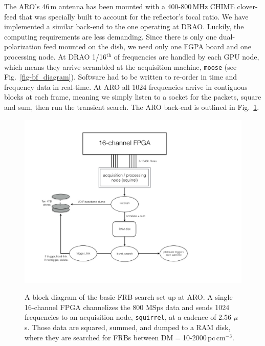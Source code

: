 The ARO's 46\,m antenna has been mounted with a 
400-800\,MHz CHIME clover-feed that was specially 
built to account for the reflector's focal ratio. 
We have implemented a similar back-end to the 
one operating at DRAO. Luckily, the computing 
requirements are less demanding. Since there is only 
one dual-polarization feed mounted on the dish, 
we need only one FGPA board and one processing node. 
At DRAO 1/16$^{\textrm{th}}$ of frequencies are 
handled by each GPU node, which means they arrive scrambled
at the acquisition machine, {\tt moose} (see Fig.~\ref{fig-bf_diagram}). 
Software had to be written to re-order in time and frequency 
data in real-time. At ARO all 1024 frequencies arrive in contiguous 
blocks at each frame, meaning we simply listen to a socket 
for the packets, square and sum, then run the transient search. The ARO 
back-end is outlined in Fig.~\ref{fig-aro_diagram}.


\begin{figure}[!h]
\begin{center}
\includegraphics[trim={0in, 0in, 0in, 0in}, width=\textwidth]{./figures/beamforming/aro_diagram.jpeg}
\caption[abc]{A block diagram of the basic 
     FRB search set-up at ARO. A single 16-channel FPGA
     channelizes the 800 MSps data and sends 1024 frequencies 
     to an acquisition node, {\tt squirrel}, at a cadence of 2.56 $\mu$s.
     Those data are squared, summed, and dumped to a RAM disk, 
     where they are searched for FRBs between DM$=$10-2000\,pc\,cm$^{-3}$.}
\vspace{0.4cm}   
\label{fig-aro_diagram}
\end{center}
\end{figure}

